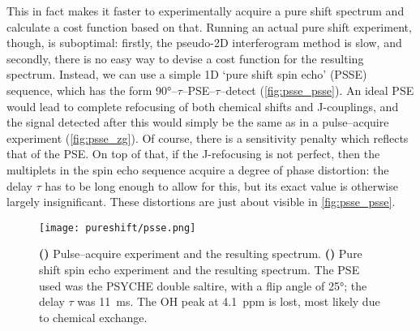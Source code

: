 This in fact makes it faster to experimentally acquire a pure shift spectrum and calculate a cost function based on that.
Running an actual pure shift experiment, though, is suboptimal: firstly, the pseudo-2D interferogram method is slow, and secondly, there is no easy way to devise a cost function for the resulting spectrum.
Instead, we can use a simple 1D `pure shift spin echo' (PSSE) sequence, which has the form \ang{90}--$\tau$--PSE--$\tau$--detect (\cref{fig:psse_psse}).
An ideal PSE would lead to complete refocusing of both chemical shifts and J-couplings, and the signal detected after this would simply be the same as in a pulse--acquire experiment (\cref{fig:psse_zg}).
Of course, there is a sensitivity penalty which reflects that of the PSE.
On top of that, if the J-refocusing is not perfect, then the multiplets in the spin echo sequence acquire a degree of phase distortion: the delay $\tau$ has to be long enough to allow for this, but its exact value is otherwise largely insignificant.
These distortions are just about visible in \cref{fig:psse_psse}.

\begin{figure}[htbp]
    \centering
    \texttt{[image: pureshift/psse.png]}
    {\label{fig:psse_zg}}
    {\label{fig:psse_psse}}
    \caption[Pure shift spin echo experiment]{
        \textbf{()} Pulse--acquire experiment and the resulting spectrum.
        \textbf{()} Pure shift spin echo experiment and the resulting spectrum.
        The PSE used was the PSYCHE double saltire, with a flip angle of \ang{25}; the delay $\tau$ was \SI{11}{\ms}.
        The OH peak at \SI{4.1}{ppm} is lost, most likely due to chemical exchange.
    }
    \label{fig:ps_optim}
\end{figure}


